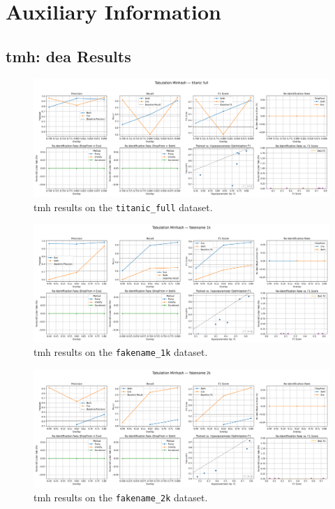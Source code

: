 \chapter{Auxiliary Information}

\section{\ac{tmh}: \ac{dea} Results} \label{sec:tabminhash_results}

\begin{figure}[H]
    \centering
    \includegraphics[width=\textwidth]{figures/TabMinHash_titanic_full_metrics.png}
    \caption{\ac{tmh} results on the \texttt{titanic\_full} dataset.}
    \label{fig:tabminhash_titanic}
\end{figure}

\begin{figure}[H]
    \centering
    \includegraphics[width=\textwidth]{figures/TabMinHash_fakename_1k_metrics.png}
    \caption{\ac{tmh} results on the \texttt{fakename\_1k} dataset.}
    \label{fig:tabminhash_fakename1k}
\end{figure}

\begin{figure}[H]
    \centering
    \includegraphics[width=\textwidth]{figures/TabMinHash_fakename_2k_metrics.png}
    \caption{\ac{tmh} results on the \texttt{fakename\_2k} dataset.}
    \label{fig:tabminhash_fakename2k}
\end{figure}


